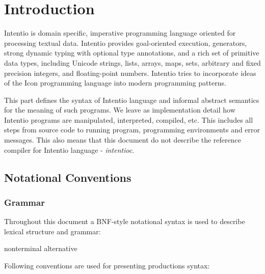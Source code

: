 \chapter{Introduction}

Intentio is domain specific, imperative programming language oriented for processing textual data. Intentio provides goal-oriented execution, generators, strong dynamic typing with optional type annotations, and a rich set of primitive data types, including Unicode strings, lists, arrays, maps, sets, arbitrary and fixed precision integers, and floating-point numbers. Intentio tries to incorporate ideas of the Icon\cite{TheIconProgrammingLanguage} programming language into modern programming patterns.

This part defines the syntax of Intentio language and informal abstract semantics for the meaning of such programs. We leave as implementation detail how Intentio programs are manipulated, interpreted, compiled, etc. This includes all steps from source code to running program, programming environments and error messages. This also means that this document do not describe the reference compiler for Intentio language - \emph{intentioc}\cite{intentioc}.


\section{Notational Conventions}

\subsection*{Grammar}

Throughout this document a BNF-style notational syntax is used to describe lexical structure and grammar:

\begin{bnf}
  nonterminal \eq {} \gor alternative
\end{bnf}

Following conventions are used for presenting productions syntax:

